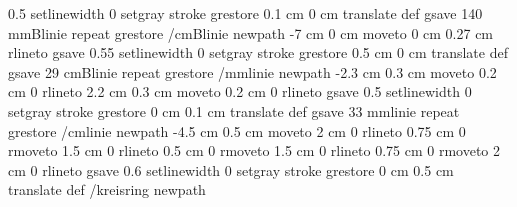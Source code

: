 {{{                     0.5 setlinewidth
                     0 setgray
                     stroke
                     grestore
                      0.1 cm 0 cm translate
                    } def
gsave
140 {mmBlinie} repeat
grestore
   /cmBlinie { newpath
                   -7 cm 0 cm moveto
                    0 cm 0.27 cm rlineto
                     gsave
                     0.55 setlinewidth
                     0 setgray
                     stroke
                     grestore
                      0.5 cm 0 cm translate
                    } def
gsave
   29 {cmBlinie} repeat
grestore
/mmlinie { newpath
                   -2.3 cm 0.3 cm moveto
                    0.2 cm 0 rlineto
                    2.2 cm 0.3 cm moveto
                    0.2 cm 0 rlineto
                     gsave
                     0.5 setlinewidth
                     0 setgray
                     stroke
                     grestore
                      0 cm 0.1 cm translate
                    } def
gsave
33 {mmlinie} repeat
grestore
/cmlinie { newpath
                   -4.5 cm 0.5 cm moveto
                    2 cm 0 rlineto
                    0.75 cm 0 rmoveto
                    1.5 cm 0 rlineto
                    0.5 cm 0 rmoveto
                    1.5 cm 0 rlineto
                    0.75 cm 0 rmoveto
                    2 cm 0 rlineto
                     gsave
                     0.6 setlinewidth
                     0 setgray
                     stroke
                     grestore
                      0 cm 0.5 cm translate
                   } def
/kreisring { newpath
}}}
